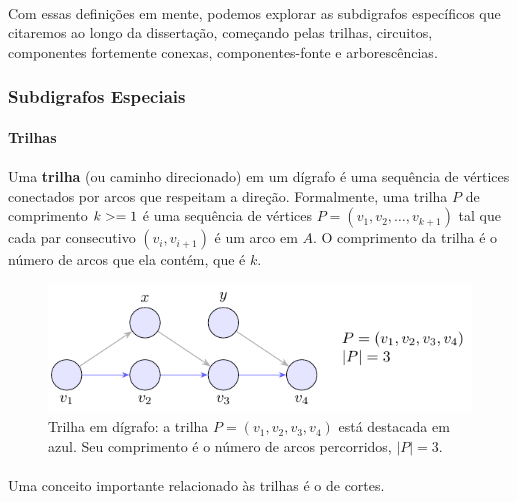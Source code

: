 \documentclass[12pt,a4paper]{article}
\def\geq{\string>=}%
\begin{document}
\paragraph{}
Com essas definições em mente, podemos explorar as subdigrafos específicos que citaremos ao longo da dissertação, começando pelas trilhas, circuitos, componentes fortemente conexas, componentes-fonte e arborescências.

\subsubsection{Subdigrafos Especiais}

\paragraph{Trilhas}

\paragraph{}
Uma \textbf{trilha} (ou caminho direcionado) em um dígrafo é uma sequência de vértices conectados por arcos que respeitam a direção. Formalmente, uma trilha \(P\) de comprimento \(k \geq 1\) é uma sequência de vértices \(P = (v_1, v_2, \ldots, v_{k+1})\) tal que cada par consecutivo \((v_i, v_{i+1})\) é um arco em \(A\). O comprimento da trilha é o número de arcos que ela contém, que é \(k\).


\begin{figure}[H]
    \centering
    \includegraphics[width=0.9\linewidth]{figures/fig_trilha.pdf}

    \caption{Trilha em dígrafo: a trilha $P=(v_1,v_2,v_3,v_4)$ está destacada em azul. Seu comprimento é o número de arcos percorridos, $|P|=3$.}
    \label{fig:trilha}\end{figure}


\paragraph{}
Uma conceito importante relacionado às trilhas é o de cortes.
\end{document}
